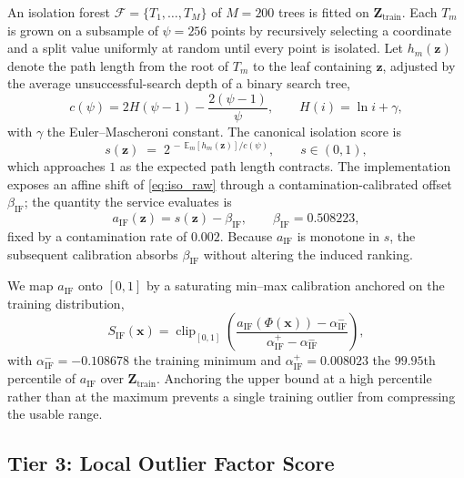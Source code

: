 \documentclass[conference]{IEEEtran}
\begin{document}
An isolation forest $\mathcal{F}=\{T_{1},\dots,T_{M}\}$ of $M=200$
trees is fitted on $\mathbf{Z}_{\mathrm{train}}$. Each $T_{m}$ is grown
on a subsample of $\psi=256$ points by recursively selecting a
coordinate and a split value uniformly at random until every point is
isolated. Let $h_{m}(\mathbf{z})$ denote the path length from the root
of $T_{m}$ to the leaf containing $\mathbf{z}$, adjusted by the average
unsuccessful-search depth of a binary search tree,
\begin{equation}
c(\psi) = 2H(\psi-1) - \frac{2(\psi-1)}{\psi},
\qquad
H(i) = \ln i + \gamma ,
\label{eq:cpsi}
\end{equation}
with $\gamma$ the Euler--Mascheroni constant. The canonical isolation
score is
\begin{equation}
s(\mathbf{z}) \;=\; 2^{\,-\,\mathbb{E}_{m}\!\left[h_{m}(\mathbf{z})\right]/c(\psi)} ,
\qquad s \in (0,1),
\label{eq:iso_raw}
\end{equation}
which approaches $1$ as the expected path length contracts. The
implementation exposes an affine shift of \eqref{eq:iso_raw} through a
contamination-calibrated offset $\beta_{\mathrm{IF}}$; the quantity the
service evaluates is
\begin{equation}
a_{\mathrm{IF}}(\mathbf{z}) = s(\mathbf{z}) - \beta_{\mathrm{IF}},
\qquad
\beta_{\mathrm{IF}} = 0.508223 ,
\label{eq:iso_a}
\end{equation}
fixed by a contamination rate of $0.002$. Because $a_{\mathrm{IF}}$ is
monotone in $s$, the subsequent calibration absorbs
$\beta_{\mathrm{IF}}$ without altering the induced ranking.

We map $a_{\mathrm{IF}}$ onto $[0,1]$ by a saturating min--max
calibration anchored on the training distribution,
\begin{equation}
S_{\mathrm{IF}}(\mathbf{x}) =
\operatorname{clip}_{[0,1]}\!\left(
\frac{a_{\mathrm{IF}}(\Phi(\mathbf{x})) - \alpha^{-}_{\mathrm{IF}}}
     {\alpha^{+}_{\mathrm{IF}} - \alpha^{-}_{\mathrm{IF}}}
\right),
\label{eq:S_IF}
\end{equation}
with $\alpha^{-}_{\mathrm{IF}} = -0.108678$ the training minimum and
$\alpha^{+}_{\mathrm{IF}} = 0.008023$ the $99.95$th percentile of
$a_{\mathrm{IF}}$ over $\mathbf{Z}_{\mathrm{train}}$. Anchoring the
upper bound at a high percentile rather than at the maximum prevents a
single training outlier from compressing the usable range.

\subsection{Tier 3: Local Outlier Factor Score}
\label{subsec:lof}
\end{document}
